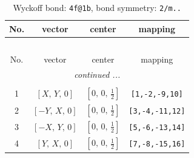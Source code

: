 \documentclass[fleqn,8pt]{jsarticle}
\begin{document}
\renewcommand{\arraystretch}{1.2}
\begin{longtable}{cccc}
\caption{Wyckoff bond: {\tt 4f@1b}, bond symmetry: {\tt 2/m..}}
 \\
 \hline \hline
No. & vector & center & mapping \\ \hline \endfirsthead

\multicolumn{3}{l}{\tablename\ \thetable{}} \\
 \hline \hline
No. & vector & center & mapping \\ \hline \endhead

 \hline \hline
\multicolumn{3}{r}{\footnotesize\it continued ...} \\ \endfoot

 \hline \hline
\multicolumn{3}{r}{} \\ \endlastfoot

1 & $\left[ X,\, Y,\, 0 \right]$ & $\left[ 0,\, 0,\, \frac{1}{2} \right]$ & {\tt [1,-2,-9,10]} \\ \hline
2 & $\left[ - Y,\, X,\, 0 \right]$ & $\left[ 0,\, 0,\, \frac{1}{2} \right]$ & {\tt [3,-4,-11,12]} \\ \hline
3 & $\left[ - X,\, Y,\, 0 \right]$ & $\left[ 0,\, 0,\, \frac{1}{2} \right]$ & {\tt [5,-6,-13,14]} \\ \hline
4 & $\left[ Y,\, X,\, 0 \right]$ & $\left[ 0,\, 0,\, \frac{1}{2} \right]$ & {\tt [7,-8,-15,16]} \\
\end{longtable}
\renewcommand{\arraystretch}{1.2}
\end{document}
